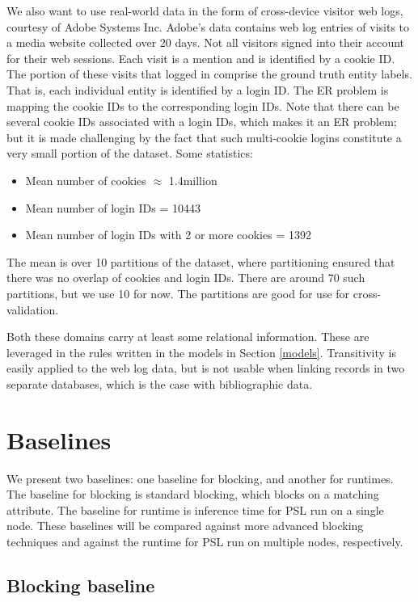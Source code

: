 \documentclass{article}
\begin{document}
We also want to use real-world data in the form of cross-device visitor web logs, courtesy of Adobe Systems Inc. Adobe's data contains web log entries of visits to a media website collected over 20 days. Not all visitors signed into their account for their web sessions. Each visit is a mention and is identified by a cookie ID. The portion of these visits that logged in comprise the ground truth entity labels. That is, each individual entity is identified by a login ID. The ER problem is mapping the cookie IDs to the corresponding login IDs. Note that there can be several cookie IDs associated with a login IDs, which makes it an ER problem; but it is made challenging by the fact that such multi-cookie logins constitute a very small portion of the dataset. Some statistics:
    \begin{itemize}
        \item Mean number of cookies $\approx$ 1.4million
        \item Mean number of login IDs = 10443
        \item Mean number of login IDs with 2 or more cookies = 1392
    \end{itemize}
    
The mean is over 10 partitions of the dataset, where partitioning ensured that there was no overlap of cookies and login IDs. There are around 70 such partitions, but we use 10 for now. The partitions are good for use for cross-validation. 

Both these domains carry at least some relational information. These are leveraged in the rules written in the models in Section \ref{models}. Transitivity is easily applied to the web log data, but is not usable when linking records in two separate databases, which is the case with bibliographic data.


\section{Baselines}

We present two baselines: one baseline for blocking, and another for runtimes. The baseline for blocking is standard blocking, which blocks on a matching attribute. The baseline for runtime is inference time for PSL run on a single node. These baselines will be compared against more advanced blocking techniques and against the runtime for PSL run on multiple nodes, respectively.

\subsection{Blocking baseline}
\end{document}
